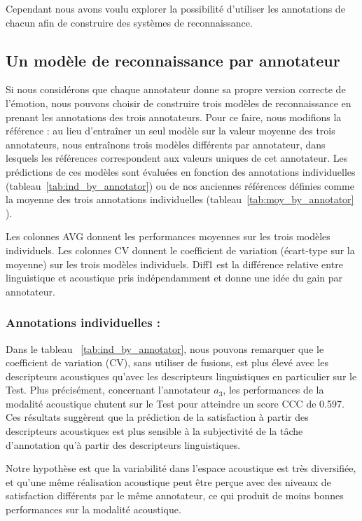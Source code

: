 Cependant nous avons voulu explorer la possibilité d'utiliser les annotations de chacun afin de construire des systèmes de reconnaissance.

\subsection{Un modèle de reconnaissance par annotateur}
Si nous considérons que chaque annotateur donne sa propre version correcte de l'émotion, nous pouvons choisir de construire trois modèles de reconnaissance en prenant les annotations des trois annotateurs. Pour ce faire, nous modifions la référence : au lieu d'entraîner un seul modèle sur la valeur moyenne des trois annotateurs, nous entraînons trois modèles différents par annotateur, dans lesquels les références correspondent aux valeurs uniques de cet annotateur.
Les prédictions de ces modèles sont évaluées en fonction des annotations individuelles (tableau~\ref{tab:ind_by_annotator}) ou de nos anciennes références définies comme la moyenne des trois annotations individuelles (tableau~\ref{tab:moy_by_annotator} ).

Les colonnes AVG donnent les performances moyennes sur les trois modèles individuels. Les colonnes CV donnent le coefficient de variation (écart-type sur la moyenne) sur les trois modèles individuels. Diff1 est la différence relative entre linguistique et acoustique pris indépendamment et donne une idée du gain par annotateur.

\subsubsection{Annotations individuelles : }



Dans le tableau ~\ref{tab:ind_by_annotator}, nous pouvons remarquer que le coefficient de variation (CV), sans utiliser de fusions, est plus élevé avec les descripteurs acoustiques qu'avec les descripteurs linguistiques en particulier sur le Test. Plus précisément, concernant l'annotateur $a_3$, les performances de la modalité acoustique chutent sur le Test pour atteindre un score CCC de 0.597.
Ces résultats suggèrent que la prédiction de la satisfaction à partir des descripteurs acoustiques est plus sensible à la subjectivité de la tâche d'annotation qu'à partir des descripteurs linguistiques.

Notre hypothèse est que la variabilité dans l'espace acoustique est très diversifiée, et qu'une même réalisation acoustique peut être perçue avec des niveaux de satisfaction différents par le même annotateur, ce qui produit de moins bonnes performances sur la modalité acoustique.

